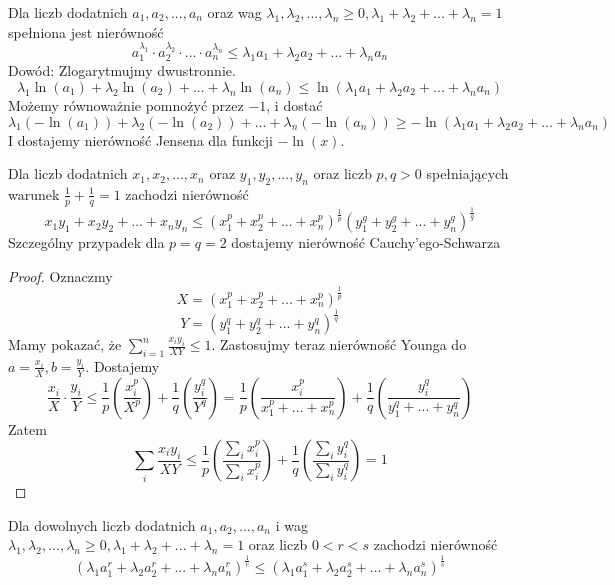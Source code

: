 \documentclass[9pt]{article}
\begin{document}
Dla liczb dodatnich $a_1, a_2, ..., a_n$ oraz wag
$\lambda_1, \lambda_2, ..., \lambda_n \ge 0, \lambda_1 + \lambda_2 + ... + \lambda_n = 1$ spełniona
jest nierówność
\[
    a_1^{\lambda_1} \cdot
    a_2^{\lambda_2} \cdot ... \cdot
    a_n^{\lambda_n}
    \le
    \lambda_1 a_1 +
    \lambda_2 a_2 + ... +
    \lambda_n a_n
\]
Dowód: Zlogarytmujmy dwustronnie.
\[
    \lambda_1 \ln (a_1) +
    \lambda_2 \ln (a_2) + ... +
    \lambda_n \ln (a_n)
    \le
    \ln (\lambda_1 a_1 + \lambda_2 a_2 + ... + \lambda_n a_n)
\]
Możemy równoważnie pomnożyć przez $-1$, i dostać
\[
    \lambda_1 (-\ln (a_1)) +
    \lambda_2 (-\ln (a_2)) + ... +
    \lambda_n (-\ln (a_n))
    \ge
    -\ln (\lambda_1 a_1 + \lambda_2 a_2 + ... + \lambda_n a_n)
\]
I dostajemy nierówność Jensena dla funkcji $-\ln (x)$.

\begin{Twi}
    Dla liczb dodatnich $x_1, x_2, ..., x_n$ oraz $y_1, y_2, ..., y_n$ oraz liczb $p, q > 0$
    spełniających warunek $\frac{1}{p} + \frac{1}{q} = 1$ zachodzi nierówność
    \[
        x_1 y_1 + x_2 y_2 + ... + x_n y_n \le
        \left(x_1^p + x_2^p + ... + x_n^p\right)^{\frac{1}{p}}
        \left(y_1^g + y_2^g + ... + y_n^g\right)^{\frac{1}{g}}
    \]
    Szczególny przypadek dla $p=q=2$ dostajemy nierówność Cauchy'ego-Schwarza
\end{Twi}

\begin{proof}
    Oznaczmy
    \[
        X = (x_1^p + x_2^p + ... + x_n^p)^{\frac{1}{p}}
    \]
    \[
        Y = (y_1^q + y_2^q + ... + y_n^q)^{\frac{1}{q}}
    \]
    Mamy pokazać, że $\sum_{i = 1}^n \frac{x_i y_i}{XY} \le 1$. Zastosujmy teraz nierówność Younga
    do $a = \frac{x_i}{X}, b = \frac{y_i}{Y}$. Dostajemy
    \[
        \frac{x_i}{X} \cdot \frac{y_i}{Y} \le
        \frac{1}{p} \left(\frac{x_i^p}{X^p}\right) +
        \frac{1}{q} \left(\frac{y_i^q}{Y^q}\right)
        =
        \frac{1}{p}
        \left(
            \frac{x_i^p}{x_1^p + ... + x_n^p}
        \right)
        +
        \frac{1}{q}
        \left(
            \frac{y_i^q}{y_1^q + ... + y_n^q}
        \right)
    \]
    Zatem
    \[
        \sum_i \frac{x_i y_i}{XY} \le
        \frac{1}{p}
        \left(
            \frac{\sum_i x_i^p}{\sum_i x_i^p}
        \right)
        +
        \frac{1}{q}
        \left(
            \frac{\sum_i y_i^q}{\sum_i y_i^q}
        \right)
        = 1
    \]
\end{proof}

\begin{Twi}
    Dla dowolnych liczb dodatnich $a_1, a_2, ..., a_n$ i wag
    $\lambda_1, \lambda_2, ..., \lambda_n \ge 0, \lambda_1 + \lambda_2 + ... + \lambda_n = 1$ oraz
    liczb $0 < r < s$ zachodzi nierówność
    \[
        (\lambda_1 a_1^r + \lambda_2 a_2^r + ... + \lambda_n a_n^r)^{\frac{1}{r}}
        \le
        (\lambda_1 a_1^s + \lambda_2 a_2^s + ... + \lambda_n a_n^s)^{\frac{1}{s}}
    \]
\end{Twi}
\end{document}
